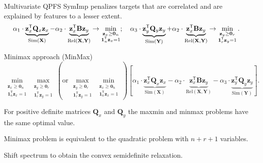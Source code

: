 \documentclass[9pt]{beamer}
\newcommand{\bz}{\mathbf{z}}
\newcommand{\bY}{\mathbf{Y}}
\newcommand{\bX}{\mathbf{X}}
\newcommand{\bB}{\mathbf{B}}
\newcommand{\bQ}{\mathbf{Q}}
\newcommand{\bOne}{\boldsymbol{1}}
\newcommand{\bZero}{\boldsymbol{0}}
\newcommand{\T}{\mathsf{T}}
\begin{document}
\begin{frame}{Multivariate QPFS}
SymImp penalizes targets that are correlated and are explained by features to a lesser extent. 
\[
\alpha_1 \cdot \underbrace{\bz_x^{\T} \bQ_x \bz_x}_{\text{Sim}(\bX)} - \alpha_2 \cdot \underbrace{\vphantom{()} \bz_x^{\T}\mathbf{B} \bz_y}_{\text{Rel}(\bX, \bY)} \rightarrow \min_{\substack{\bz_x \geq \bZero_n \\ \bOne_n^{\T}\bz_x=1}}; \quad
\alpha_3 \cdot \underbrace{\bz_y^{\T} \bQ_y \bz_y}_{\text{Sim}(\bY)} + \alpha_2 \cdot \underbrace{\vphantom{()} \bz_x^{\T} \mathbf{B} \bz_y}_{\text{Rel}(\bX, \bY)} \rightarrow \min_{\substack{\bz_y \geq \bZero_r  \\ \bOne_r^{\T}\bz_y=1}}.
\]
\vspace{-0.2cm}
\begin{block}{Minimax approach (MinMax)}
\vspace{-0.5cm}
\[
\min_{\substack{\bz_x \geq \bZero_n \\ \bOne_n^{\T}\bz_x=1}} 	\max_{\substack{\bz_y \geq \bZero_r \\ \bOne_r^{\T}\bz_y=1}} \left(\text {or} \, \max_{\substack{\bz_y \geq \bZero_r \\ \bOne_r^{\T}\bz_y=1}} \min_{\substack{\bz_x \geq \bZero_n \\ \bOne_n^{\T}\bz_x=1}}\right) \left[\alpha_1 \cdot \underbrace{\bz_x^{\T} \bQ_x \bz_x}_{\text{Sim}(\bX)} - \alpha_2 \cdot \underbrace{\bz_x^{\T} \bB \bz_y}_{\text{Rel}(\bX, \bY)} - \alpha_3 \cdot \underbrace{\bz_y^{\T} \bQ_y \bz_y}_{\text{Sim}(\bY)}\right].
\]
\end{block}
\vspace{-0.4cm}
\begin{theorem}[Isachenko, 2018]
	For positive definite matrices $\bQ_x$ and $\bQ_y$ the maxmin and minmax problems have the same optimal value. 
\end{theorem}
\vspace{-0.2cm}
\begin{theorem}[Isachenko, 2018]
	Minimax problem is equivalent to the quadratic problem with $n + r + 1$ variables.
\end{theorem}
Shift spectrum to obtain the convex semidefinite relaxation.

\end{frame}
\end{document}
